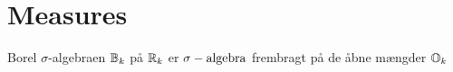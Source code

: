 \section[Lecture 1]{Measures} %
\label{sec:lecture_1}
\begin{defn}
Borel \(\sigma\)-algebraen \({\mathbb{B}}_k\) på \({\mathbb{R}}_k\) er \(\sigma-\text{algebra}\) frembragt på de åbne mængder \({\mathbb{O}}_k\)
\end{defn}

